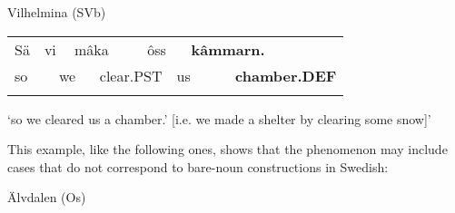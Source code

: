 \begin{listWWNumileveli}
\item 

\begin{styleExample}
Vilhelmina (SVb)

\end{styleExample}

\end{listWWNumileveli}

\begin{tabular}{llllllllll}
\lsptoprule
Sä & \multicolumn{2}{l}{vi

} & \multicolumn{2}{l}{mâka

} & \multicolumn{2}{l}{ôss

} & \multicolumn{2}{l}{{\bfseries kâmmarn.}

} & \\
\multicolumn{2}{l}{so

} & \multicolumn{2}{l}{we

} & \multicolumn{2}{l}{clear.PST

} & \multicolumn{2}{l}{us

} & \multicolumn{2}{l}{{\bfseries chamber.DEF}

}\\
\lspbottomrule
\end{tabular}

\begin{styleTranslation}
‘so we cleared us a chamber.’ [i.e. we made a shelter by clearing some snow]’

\end{styleTranslation}

\begin{styleBodyTextFirst}
This example, like the following ones, shows that the phenomenon may include cases that do not correspond to bare-noun constructions in Swedish: 

\end{styleBodyTextFirst}

\begin{listWWNumileveli}
\item 

\begin{styleExample}
Älvdalen (Os)

\end{styleExample}

\end{listWWNumileveli}

\begin{listWWNumxciileveli}
\item 

\end{listWWNumxciileveli}

